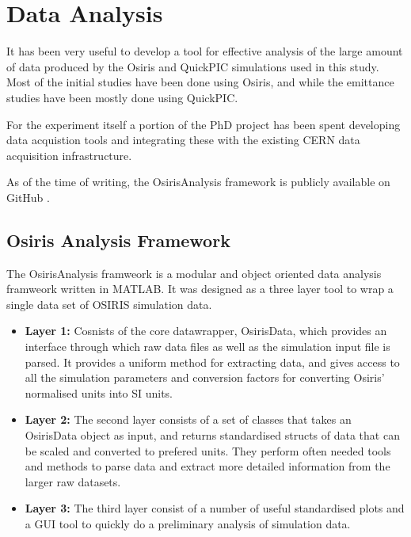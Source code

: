 %
%

\chapter{Data Analysis}
\label{Apx:DA}

It has been very useful to develop a tool for effective analysis of the large amount of data produced by the Osiris and QuickPIC simulations used in this study. Most of the initial studies have been done using Osiris, and while the emittance studies have been mostly done using QuickPIC.

For the experiment itself a portion of the PhD project has been spent developing data acquistion tools and integrating these with the existing CERN data acquisition infrastructure.

As of the time of writing, the OsirisAnalysis framework is publicly available on GitHub \cite{berglyd_olsen_osirisanalysis:_2013}.

\section{Osiris Analysis Framework}
\label{Tools:OA}

The OsirisAnalysis framweork is a modular and object oriented data analysis framweork written in MATLAB. It was designed as a three layer tool to wrap a single data set of OSIRIS simulation data.

\begin{itemize}
    \item \textbf{Layer 1:} Cosnists of the core datawrapper, OsirisData, which provides an interface through which raw data files as well as the simulation input file is parsed. It provides a uniform method for extracting data, and gives access to all the simulation parameters and conversion factors for converting Osiris' normalised units into SI units.
    \item \textbf{Layer 2:} The second layer consists of a set of classes that takes an OsirisData object as input, and returns standardised structs of data that can be scaled and converted to prefered units. They perform often needed tools and methods to parse data and extract more detailed information from the larger raw datasets.
    \item \textbf{Layer 3:} The third layer consist of a number of useful standardised plots and a GUI tool to quickly do a preliminary analysis of simulation data.
\end{itemize}

